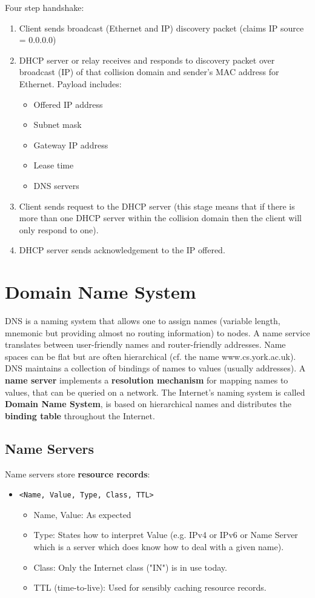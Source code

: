 \documentclass[11pt]{article}
\begin{document}
Four step handshake:
\begin{enumerate}
\item Client sends broadcast (Ethernet and IP) discovery packet (claims IP source = 0.0.0.0)
\item DHCP server or relay receives and responds to discovery packet over broadcast (IP) of that collision domain and sender's MAC address for Ethernet. Payload includes:
\begin{itemize}
\item Offered IP address
\item Subnet mask
\item Gateway IP address
\item Lease time
\item DNS servers
\end{itemize}
\item Client sends request to the DHCP server (this stage means that if there is more than one DHCP server within the collision domain then the client will only respond to one).
\item DHCP server sends acknowledgement to the IP offered.
\end{enumerate}

\section{Domain Name System}
\label{sec:orgc99ba1c}
DNS is a naming system that allows one to assign names (variable length, mnemonic but providing almost no routing information) to nodes.
A name service translates between user-friendly names and router-friendly addresses.
Name spaces can be flat but are often hierarchical (cf. the name www.cs.york.ac.uk).
DNS maintains a collection of bindings of names to values (usually addresses).
A \textbf{name server} implements a \textbf{resolution mechanism} for mapping names to values, that can be queried on a network.
The Internet's naming system is called \textbf{Domain Name System}, is based on hierarchical names and distributes the \textbf{binding table} throughout the Internet.

\subsection{Name Servers}
\label{sec:orge63a050}
Name servers store \textbf{resource records}:
\begin{itemize}
\item \texttt{<Name, Value, Type, Class, TTL>}
\begin{itemize}
\item Name, Value: As expected
\item Type: States how to interpret Value (e.g. IPv4 or IPv6 or Name Server which is a server which does know how to deal with a given name).
\item Class: Only the Internet class ("IN") is in use today.
\item TTL (time-to-live): Used for sensibly caching resource records.
\end{itemize}
\end{itemize}
\end{document}

